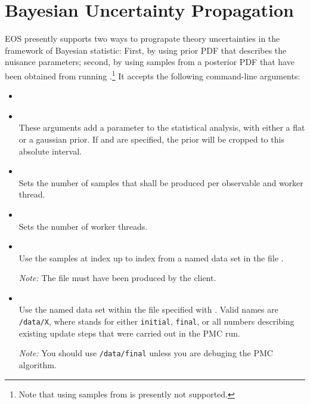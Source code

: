 \section{Bayesian Uncertainty Propagation}
\label{sec:usage:eos-propagate-uncertainty}

EOS presently supports two ways to prograpate theory uncertainties in the
framework of Bayesian statistic: First, by using prior PDF that describes
the nuisance parameters; second, by using samples from a posterior PDF that
have been obtained from running .\footnote{%
    Note that using samples from  is presently not supported.
}
It accepts the following command-line arguments:
\begin{itemize}
    \item[] \\[-3\medskipamount]
    \item[] \\[\medskipamount]
        These arguments add a parameter to the statistical analysis, with
        either a flat or a gaussian prior. If  and
         are specified, the prior will be cropped to this
        absolute interval.

    \item[] \\[\medskipamount]
        Sets the number of samples that shall be produced per observable and
        worker thread.

    \item[] \\[\medskipamount]
        Sets the number of worker threads.

    \item[] \\[\medskipamount]
        Use the samples at index  up to index  from
        a named data set in the file .

        \emph{Note:} The file must have been produced by the
         client.
    \item[] \\[\medskipamount]
        Use the named data set within the file specified with .
        Valid names are \texttt{/data/X}, where  stands for either
        \texttt{initial}, \texttt{final}, or all numbers describing existing
        update steps that were carried out in the PMC run.

        \emph{Note:} You should use \texttt{/data/final} unless you are
        debuging the PMC algorithm.
\end{itemize}

